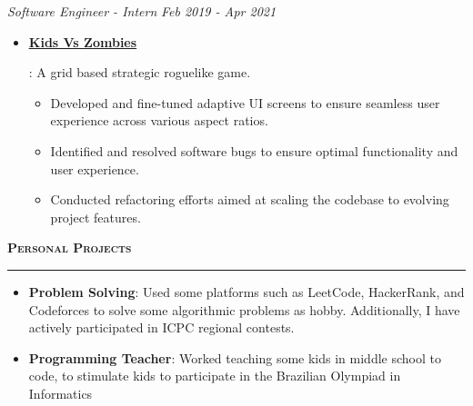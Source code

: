 \documentclass{article}
\newcommand{\resumeItem}[2]{
  \item{
    \textbf{#1}{: #2 \vspace{-5pt}}
  }
}
\newcommand{\simpleItem}[1]{
  \item{
    #1 \vspace{-3pt}
  }
}
\newcommand{\resumeSubSubheading}[2]{
    \noindent
    \vspace{5pt}
    \textit{#1} \dotfill \textit{ #2} \\
}
\newcommand{\resumeItemListStart}{\vspace{-14pt}\begin{itemize}}
\newcommand{\resumeItemListEnd}{\end{itemize}}
\newcommand{\resumeSubHeadingListStart}{\vspace{-10pt}\begin{itemize}}
\newcommand{\resumeSubHeadingListEnd}{\end{itemize}}
\newcommand{\resumeSubItemListStart}{\vspace{-5pt}\begin{itemize}}
\newcommand{\resumeSubItemListEnd}{\end{itemize}}
\newcommand{\resumeSection}[1]{
  \vspace{5pt}
  {\Large\textbf{\textsc{#1}}} \\
  \par\nobreak\vspace{-6pt}\noindent\textcolor{black}{\rule{\linewidth}{0.4pt}}%
}
\begin{document}
    \resumeSubSubheading
    {Software Engineer - Intern}{Feb 2019 - Apr 2021}
      \resumeSubHeadingListStart
        \resumeItem
          {\href{https://www.youtube.com/watch?v=MLjikLDk6D8&ab_channel=LumenGames}{\color{blue}\underline{Kids Vs Zombies}}}
          {A grid based strategic roguelike game.
            \resumeSubItemListStart
              \simpleItem{Developed and fine-tuned adaptive UI screens to ensure seamless user experience across various aspect ratios.}
              \simpleItem{Identified and resolved software bugs to ensure optimal functionality and user experience.}
              \simpleItem{Conducted refactoring efforts aimed at scaling the codebase to evolving project features.}
            \resumeSubItemListEnd
          }
      \resumeSubHeadingListEnd


\resumeSection{Personal Projects}
  \resumeItemListStart
    \resumeItem{Problem Solving}
      {Used some platforms such as LeetCode, HackerRank, and Codeforces to solve some algorithmic problems as hobby. Additionally, I have actively participated in ICPC regional contests.}
    \resumeItem{Programming Teacher}
      {Worked teaching some kids in middle school to code, to stimulate kids to participate in the Brazilian Olympiad in Informatics}
  \resumeItemListEnd
\end{document}
